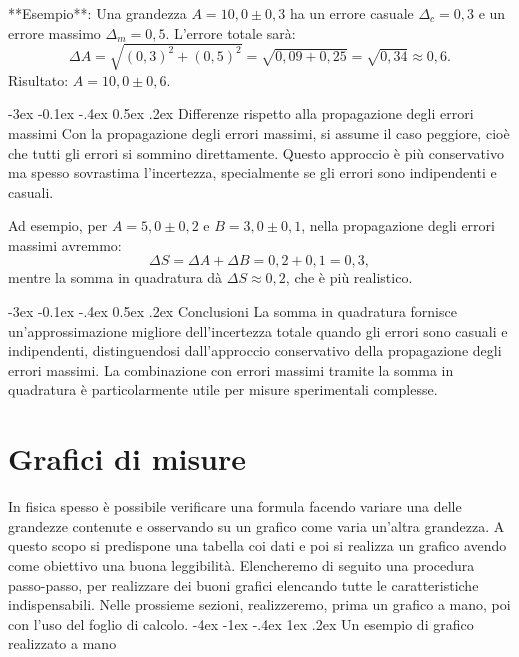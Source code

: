 \documentclass[12pt,a4paper,oneside]{book}
\makeatletter
\renewcommand{\section}{\@startsection{section}{1}{\z@}
{-4ex \@plus -1ex \@minus -.4ex}
{1ex \@plus.2ex }
{\normalfont\large\sffamily\bfseries}}
\renewcommand{\subsection}{\@startsection {subsection}{2}{\z@}
{-3ex \@plus -0.1ex \@minus -.4ex}
{0.5ex \@plus.2ex }
{\color[rgb]{0.141,0.596,0.749}\normalfont\sffamily\bfseries}}
\theoremstyle{esercizio}
\makeatother
\begin{document}
**Esempio**:  
Una grandezza $A = 10,0 \pm 0,3$ ha un errore casuale $\Delta_c = 0,3$ e un errore massimo $\Delta_m = 0,5$. L'errore totale sarà:
\[
\Delta A = \sqrt{(0,3)^2 + (0,5)^2} = \sqrt{0,09 + 0,25} = \sqrt{0,34} \approx 0,6.
\]
Risultato: $A = 10,0 \pm 0,6$.

\subsection{Differenze rispetto alla propagazione degli errori massimi}
Con la propagazione degli errori massimi, si assume il caso peggiore, cioè che tutti gli errori si sommino direttamente. Questo approccio è più conservativo ma spesso sovrastima l'incertezza, specialmente se gli errori sono indipendenti e casuali.

Ad esempio, per $A = 5,0 \pm 0,2$ e $B = 3,0 \pm 0,1$, nella propagazione degli errori massimi avremmo:
\[
\Delta S = \Delta A + \Delta B = 0,2 + 0,1 = 0,3,
\]
mentre la somma in quadratura dà $\Delta S \approx 0,2$, che è più realistico.

\subsection{Conclusioni}
La somma in quadratura fornisce un'approssimazione migliore dell'incertezza totale quando gli errori sono casuali e indipendenti, distinguendosi dall'approccio conservativo della propagazione degli errori massimi. La combinazione con errori massimi tramite la somma in quadratura è particolarmente utile per misure sperimentali complesse.

 \chapter{Grafici di misure}
In fisica spesso è possibile verificare una formula facendo variare una delle grandezze contenute e osservando su un grafico come varia un'altra grandezza. A questo scopo si predispone una tabella coi dati e poi si realizza un grafico avendo come obiettivo una buona leggibilità. Elencheremo di seguito una procedura passo-passo, per realizzare dei buoni grafici elencando tutte le caratteristiche indispensabili. Nelle prossieme sezioni, realizzeremo, prima un grafico a mano, poi con l'uso del foglio di calcolo.
\section{Un esempio di grafico realizzato a mano}
\end{document}
